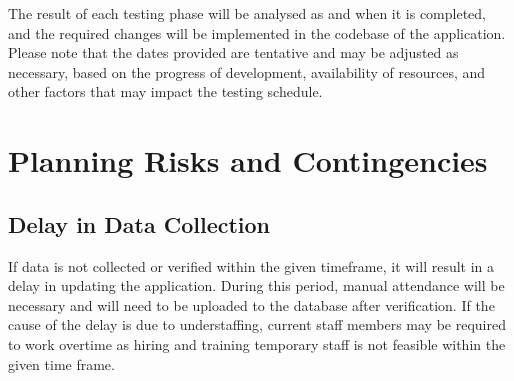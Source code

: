 \documentclass{scrreprt}
\begin{document}
The result of each testing phase will be analysed as and when it is completed, and the required changes will be implemented in the codebase of the application. \\

Please note that the dates provided are tentative and may be adjusted as necessary, based on the progress of development, availability of resources, and other factors that may impact the testing schedule.

\chapter{Planning Risks and Contingencies}
\section{Delay in Data Collection}
If data is not collected or verified within the given timeframe, it will result in a delay in updating the application. During this period, manual attendance will be necessary and will need to be uploaded to the database after verification.
If the cause of the delay is due to understaffing, current staff members may be required to work overtime as hiring and training temporary staff is not feasible within the given time frame.
\end{document}
